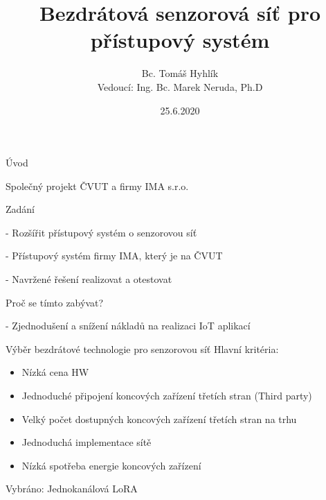 \documentclass{beamer}
\title{Bezdrátová senzorová síť pro přístupový systém}
\date{25.6.2020}
\author{Bc. Tomáš Hyhlík \\
Vedoucí: Ing. Bc. Marek Neruda, Ph.D}
\institute{Katedra Mikroelektroniky}
\newcommand{\SubItem}[1]{
    {\setlength\itemindent{15pt} \item[]#1}
}
\begin{document}
	\maketitle
  

\begin{frame}{Úvod}

	\begin{itemize}
		\item Společný projekt ČVUT a firmy IMA s.r.o. 
		\item Zadání
		\SubItem{- Rozšířit přístupový systém o senzorovou síť}
		\SubItem{- Přístupový systém firmy IMA, který je na ČVUT}
		\SubItem{- Navržené řešení realizovat a otestovat}
		\item Proč se tímto zabývat?
		\SubItem{- Zjednodušení a snížení nákladů na realizaci IoT aplikací}
	\end{itemize}

\end{frame}


\begin{frame}{Výběr bezdrátové technologie pro senzorovou síť}
	Hlavní kritéria:
	\begin{itemize}
		\item Nízká cena HW
		\item Jednoduché připojení koncových zařízení třetích stran (Third party)
		\item Velký počet dostupných koncových zařízení třetích stran na trhu 
		\item Jednoduchá implementace sítě
		\item Nízká spotřeba energie koncových zařízení
	\end{itemize}

	Vybráno: Jednokanálová LoRA

\end{frame}
\end{document}
